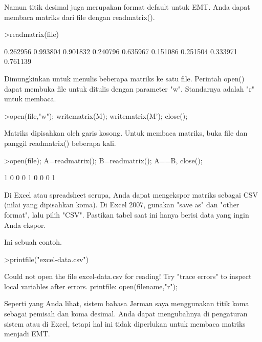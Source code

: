 \documentclass[a4paper,10pt]{article}
\begin{document}
\begin{eulernotebook}
\begin{eulercomment}
\begin{eulercomment}
\begin{eulercomment}
Namun titik desimal juga merupakan format default untuk EMT. Anda
dapat membaca matriks dari file dengan readmatrix().
\end{eulercomment}
\begin{eulerprompt}
>readmatrix(file)
\end{eulerprompt}
\begin{euleroutput}
       0.262956      0.993804      0.901832 
       0.240796      0.635967      0.151086 
       0.251504      0.333971      0.761139 
\end{euleroutput}
\begin{eulercomment}
Dimungkinkan untuk menulis beberapa matriks ke satu file. Perintah
open() dapat membuka file untuk ditulis dengan parameter "w".
Standarnya adalah "r" untuk membaca.
\end{eulercomment}
\begin{eulerprompt}
>open(file,"w"); writematrix(M); writematrix(M'); close();
\end{eulerprompt}
\begin{eulercomment}
Matriks dipisahkan oleh garis kosong. Untuk membaca matriks, buka file
dan panggil readmatrix() beberapa kali.
\end{eulercomment}
\begin{eulerprompt}
>open(file); A=readmatrix(); B=readmatrix(); A==B, close();
\end{eulerprompt}
\begin{euleroutput}
              1             0             0 
              0             1             0 
              0             0             1 
\end{euleroutput}
\begin{eulercomment}
Di Excel atau spreadsheet serupa, Anda dapat mengekspor matriks
sebagai CSV (nilai yang dipisahkan koma). Di Excel 2007, gunakan "save
as" dan "other format", lalu pilih "CSV". Pastikan tabel saat ini
hanya berisi data yang ingin Anda ekspor.

Ini sebuah contoh.
\end{eulercomment}
\begin{eulerprompt}
>printfile("excel-data.csv")
\end{eulerprompt}
\begin{euleroutput}
  Could not open the file
  excel-data.csv
  for reading!
  Try "trace errors" to inspect local variables after errors.
  printfile:
      open(filename,"r");
\end{euleroutput}
\begin{eulercomment}
Seperti yang Anda lihat, sistem bahasa Jerman saya menggunakan titik
koma sebagai pemisah dan koma desimal. Anda dapat mengubahnya di
pengaturan sistem atau di Excel, tetapi hal ini tidak diperlukan untuk
membaca matriks menjadi EMT.


\end{eulercomment}
\end{eulercomment}
\end{eulercomment}
\end{eulernotebook}
\end{document}
